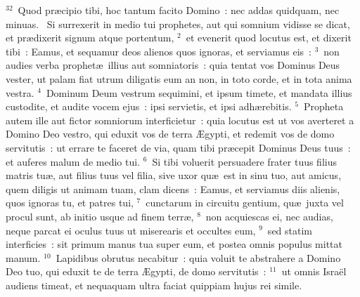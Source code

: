 ${}^{32}$~Quod pr\ae cipio tibi, hoc tantum facito Domino~: nec addas quidquam, nec minuas.
~Si surrexerit in medio tui prophetes, aut qui somnium vidisse se dicat, et pr\ae dixerit signum atque portentum,
${}^{2}$~et evenerit quod locutus est, et dixerit tibi~: Eamus, et sequamur deos alienos quos ignoras, et serviamus eis~:
${}^{3}$~non audies verba prophet\ae\ illius aut somniatoris~: quia tentat vos Dominus Deus vester, ut palam fiat utrum diligatis eum an non, in toto corde, et in tota anima vestra.
${}^{4}$~Dominum Deum vestrum sequimini, et ipsum timete, et mandata illius custodite, et audite vocem ejus~: ipsi servietis, et ipsi adh\ae rebitis.
${}^{5}$~Propheta autem ille aut fictor somniorum interficietur~: quia locutus est ut vos averteret a Domino Deo vestro, qui eduxit vos de terra \AE gypti, et redemit vos de domo servitutis~: ut errare te faceret de via, quam tibi pr\ae cepit Dominus Deus tuus~: et auferes malum de medio tui.
${}^{6}$~Si tibi voluerit persuadere frater tuus filius matris tu\ae , aut filius tuus vel filia, sive uxor qu\ae\ est in sinu tuo, aut amicus, quem diligis ut animam tuam, clam dicens~: Eamus, et serviamus diis alienis, quos ignoras tu, et patres tui,
${}^{7}$~cunctarum in circuitu gentium, qu\ae\ juxta vel procul sunt, ab initio usque ad finem terr\ae ,
${}^{8}$~non acquiescas ei, nec audias, neque parcat ei oculus tuus ut miserearis et occultes eum,
${}^{9}$~sed statim interficies~: sit primum manus tua super eum, et postea omnis populus mittat manum.
${}^{10}$~Lapidibus obrutus necabitur~: quia voluit te abstrahere a Domino Deo tuo, qui eduxit te de terra \AE gypti, de domo servitutis~:
${}^{11}$~ut omnis Isra\"el audiens timeat, et nequaquam ultra faciat quippiam hujus rei simile.


